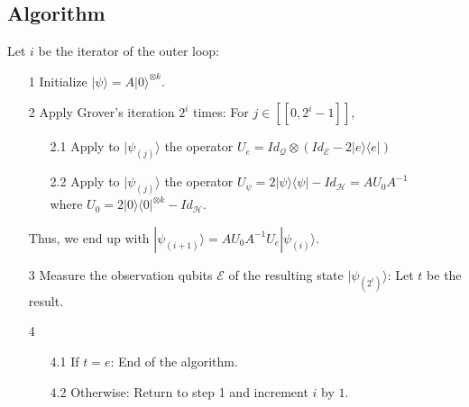 \subsection{Algorithm}
\label{alg:QuantRS}
\begin{algorithm}[H]
Let $i$ be the iterator of the outer loop:
\begin{itemize}
    \item[1] Initialize $|\psi \rangle = A|0\rangle^{\otimes k}$.
    \item[2] Apply Grover's iteration $2^i$ times: For $j \in [\![0, 2^i-1]\!]$,
    \begin{itemize}
  	 
   	 \item[2.1] Apply to $|\psi_{(j)}\rangle$ the operator $
   	 U_{e} = Id_{\mathcal{Q}} \otimes (Id_{\mathcal{E}} -  2|e \rangle \langle e| )
   	 $
   	 \item[2.2] Apply to $|\psi_{(j)}\rangle$ the operator $U_{\psi} = 2|\psi\rangle \langle \psi | - Id_{\mathcal{H}} = AU_{0}A^{-1}
   	 $
     \\ where $U_{0} = 2|0\rangle \langle 0|^{\otimes k} - Id_{\mathcal{H}}$.
   	 
    \end{itemize}
    \item[] Thus, we end up with $|\psi_{(i+1)}\rangle = AU_{0}A^{-1}U_{e} |\psi_{(i)} \rangle$.
    \item[3] Measure the observation qubits $\mathcal{E}$ of the resulting state $|\psi_{(2^i)} \rangle$: Let $t$ be the result.
	\item[4]
	\begin{itemize}
   	 \item[4.1] If $t=e$: End of the algorithm.
   	 \item[4.2] Otherwise: Return to step 1 and increment $i$ by $1$.
    \end{itemize}
\end{itemize}
\end{algorithm}

